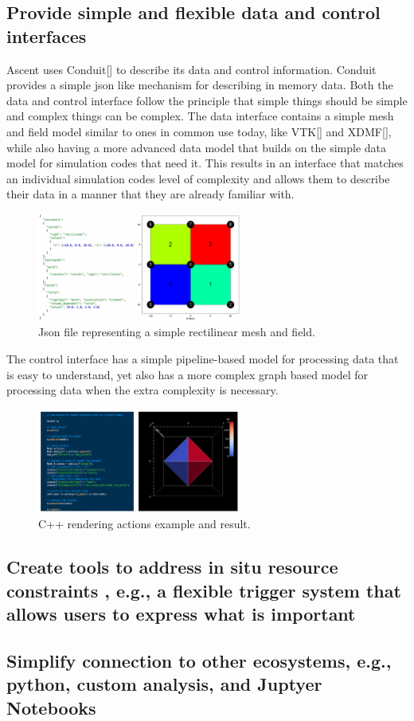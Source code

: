 \subsection{Provide simple and flexible data and control interfaces}
Ascent uses Conduit[] to describe its data and control information. Conduit
provides a simple json like mechanism for describing in memory data.
%
Both the data and control interface follow the principle that simple things
should be simple and complex things can be complex.
%
The data interface contains a simple mesh and field model similar to ones
in common use today, like VTK[] and XDMF[], while also having a more advanced
data model that builds on the simple data model for simulation codes that
need it.
%
This results in an interface that matches an individual simulation codes
level of complexity and allows them to describe their data in a manner that
they are already familiar with.
%

\begin{figure}
\centering
\includegraphics[width=0.6\textwidth]{images/conduit_data_example}
\caption{\label{img:conduit_data_example} Json file representing a simple rectilinear mesh and field.}
\end{figure}

%
The control interface has a simple pipeline-based model for processing
data that is easy to understand, yet also has a more complex graph based
model for processing data when the extra complexity is necessary.
%

\begin{figure}
\centering
\includegraphics[width=0.6\textwidth]{images/conduit_control_example}
\caption{\label{img:conduit_control_example} C++ rendering actions example and result.}
\end{figure}

\subsection{Create tools to address in situ resource constraints , e.g., a flexible trigger system that allows users to express what is important}

\subsection{Simplify connection to other ecosystems, e.g., python, custom analysis, and Juptyer Notebooks}
